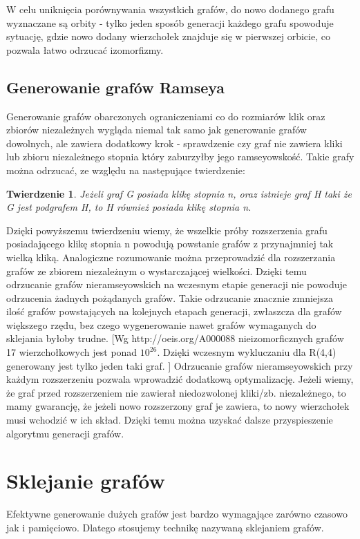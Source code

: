 \documentclass[11pt]{article}
\newtheorem{theorem}{Twierdzenie}
\begin{document}
W celu uniknięcia porównywania wszystkich grafów, do nowo dodanego grafu wyznaczane są orbity - tylko jeden sposób generacji każdego grafu spowoduje sytuację, gdzie nowo dodany wierzchołek znajduje się w pierwszej orbicie, co pozwala łatwo odrzucać izomorfizmy.

   \subsection{Generowanie grafów Ramseya}
   Generowanie grafów obarczonych ograniczeniami co do rozmiarów klik oraz zbiorów niezależnych wygląda niemal tak samo jak generowanie grafów dowolnych, 
   ale zawiera dodatkowy krok - sprawdzenie czy graf nie zawiera kliki lub zbioru niezależnego stopnia który zaburzyłby jego ramseyowskość. Takie grafy można odrzucać, ze względu na następujące twierdzenie:
     \begin{theorem}
      Jeżeli graf G posiada klikę stopnia n, oraz istnieje graf H taki że G jest podgrafem H, to H również posiada klikę stopnia n.
   \end{theorem}
  Dzięki powyższemu twierdzeniu wiemy, że wszelkie próby rozszerzenia grafu posiadającego klikę stopnia n powodują powstanie grafów z przynajmniej tak wielką kliką. Analogiczne rozumowanie można przeprowadzić dla rozszerzania grafów ze zbiorem niezależnym o wystarczającej wielkości. Dzięki temu odrzucanie grafów nieramseyowskich na wczesnym etapie generacji nie powoduje odrzucenia żadnych pożądanych grafów. Takie odrzucanie znacznie zmniejsza ilość grafów powstających na kolejnych etapach generacji, zwłaszcza dla grafów większego rzędu, bez czego wygenerowanie nawet grafów wymaganych do sklejania byłoby trudne.
[Wg http://oeis.org/A000088 nieizomorficznych grafów 17 wierzchołkowych jest ponad $10^{26}$. Dzięki wczesnym wykluczaniu dla R(4,4) generowany jest tylko jeden taki graf. ]
Odrzucanie grafów nieramseyowskich przy każdym rozszerzeniu pozwala wprowadzić dodatkową optymalizację. Jeżeli wiemy, że graf przed rozszerzeniem nie zawierał niedozwolonej kliki/zb. niezależnego, to mamy gwarancję, że jeżeli nowo rozszerzony graf je zawiera, to nowy wierzchołek musi wchodzić w ich skład. Dzięki temu można uzyskać dalsze przyspieszenie algorytmu generacji grafów.


\section{Sklejanie grafów}
Efektywne generowanie dużych grafów jest bardzo wymagające zarówno czasowo jak i pamięciowo. Dlatego stosujemy technikę nazywaną sklejaniem grafów. 
\end{document}
